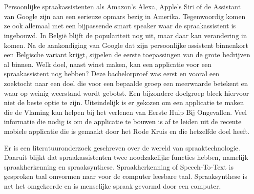 


\chapter*{}
Persoonlijke spraakassistenten als Amazon's Alexa, Apple's Siri of de Assistant van Google zijn aan een serieuze opmars bezig in Amerika. Tegenwoordig komen ze ook allemaal met een bijpassende smart speaker waar de spraakassistent is ingebouwd. In België blijft de populariteit nog uit, maar daar kan verandering in komen. Na de aankondiging van Google dat zijn persoonlijke assistent binnenkort een Belgische variant krijgt, sijpelen de eerste toepassingen van de grote bedrijven al binnen. Welk doel, naast winst maken, kan een applicatie voor een spraakassistent nog hebben? Deze bachelorproef was eerst en vooral een zoektocht naar een doel die voor een bepaalde groep een meerwaarde betekent en waar op weinig weerstand wordt gebotst. Een bijzondere doelgroep bleek hiervoor niet de beste optie te zijn. Uiteindelijk is er gekozen om een applicatie te maken die de Vlaming kan helpen bij het verlenen van Eerste Hulp Bij Ongevallen. Veel informatie die nodig is om de applicatie te bouwen is af te leiden uit de recente mobiele applicatie die is gemaakt door het Rode Kruis en die hetzelfde doel heeft.

Er is een literatuuronderzoek geschreven over de wereld van spraaktechnologie. Daaruit blijkt dat spraakassistenten twee noodzakelijke functies hebben, namelijk spraakherkenning en spraaksynthese. Spraakherkenning of Speech-To-Text is gesproken taal omvormen naar voor de computer leesbare taal. Spraaksynthese is net het omgekeerde en is menselijke spraak gevormd door een computer.


